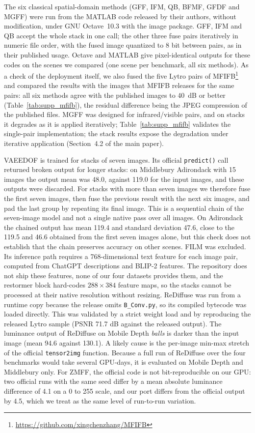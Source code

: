 The six classical spatial-domain methods (GFF, IFM, QB, BFMF, GFDF and MGFF) were run from the MATLAB code released by their authors, without modification, under GNU Octave~10.3 with the image package. GFF, IFM and QB accept the whole stack in one call; the other three fuse pairs iteratively in numeric file order, with the fused image quantized to 8 bit between pairs, as in their published usage. Octave and MATLAB give pixel-identical outputs for these codes on the scenes we compared (one scene per benchmark, all six methods). As a check of the deployment itself, we also fused the five Lytro pairs of MFIFB\footnote{\url{https://github.com/xingchenzhang/MFIFB}} and compared the results with the images that MFIFB releases for the same pairs: all six methods agree with the published images to 40~dB or better (Table~\ref{tab:supp_mfifb}), the residual difference being the JPEG compression of the published files. MGFF was designed for infrared/visible pairs, and on stacks it degrades as it is applied iteratively; Table~\ref{tab:supp_mfifb} validates the single-pair implementation; the stack results expose the degradation under iterative application (Section~4.2 of the main paper).

VAEEDOF is trained for stacks of seven images. Its official \texttt{predict()} call returned broken output for longer stacks: on Middlebury Adirondack with 15 images the output mean was 48.0, against 119.0 for the input images, and these outputs were discarded. For stacks with more than seven images we therefore fuse the first seven images, then fuse the previous result with the next six images, and pad the last group by repeating its final image. This is a sequential chain of the seven-image model and not a single native pass over all images. On Adirondack the chained output has mean 119.4 and standard deviation 47.6, close to the 119.5 and 46.6 obtained from the first seven images alone, but this check does not establish that the chain preserves accuracy on other scenes. FILM was excluded. Its inference path requires a 768-dimensional text feature for each image pair, computed from ChatGPT descriptions and BLIP-2 features. The repository does not ship these features, none of our four datasets provides them, and the restormer block hard-codes $288\times384$ feature maps, so the stacks cannot be processed at their native resolution without resizing. ReDiffuse was run from a runtime copy because the release omits \texttt{B\_Conv.py}, so its compiled bytecode was loaded directly. This was validated by a strict weight load and by reproducing the released Lytro sample (PSNR 71.7 dB against the released output). The luminance output of ReDiffuse on Mobile Depth \emph{balls} is darker than the input image (mean 94.6 against 130.1). A likely cause is the per-image min-max stretch of the official \texttt{tensor2img} function. Because a full run of ReDiffuse over the four benchmarks would take several GPU-days, it is evaluated on Mobile Depth and Middlebury only. For ZMFF, the official code is not bit-reproducible on our GPU: two official runs with the same seed differ by a mean absolute luminance difference of 4.1 on a 0 to 255 scale, and our port differs from the official output by 4.5, which we treat as the same level of run-to-run variation.

